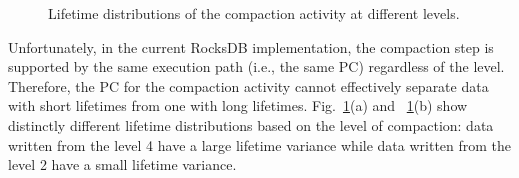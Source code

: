 
\begin{figure}[!t]
\centering
{}  %
	\hspace{10pt}
\caption{Lifetime distributions of the compaction activity at different levels.} %
\label{fig:compaction}
	\vspace{-20pt}
\end{figure}




Unfortunately, in the current RocksDB implementation, the compaction step is supported 
by the same execution path (i.e., the same PC) regardless of the level.
Therefore, the PC for the compaction activity cannot effectively separate data with 
short lifetimes from one with long lifetimes.
Fig.~\ref{fig:compaction}(a) and ~\ref{fig:compaction}(b) show
{\color{blue}
distinctly different lifetime distributions based on the level of compaction:
data written from the level 4 have a large lifetime variance while data written from
the level 2 have a small lifetime variance.
}

